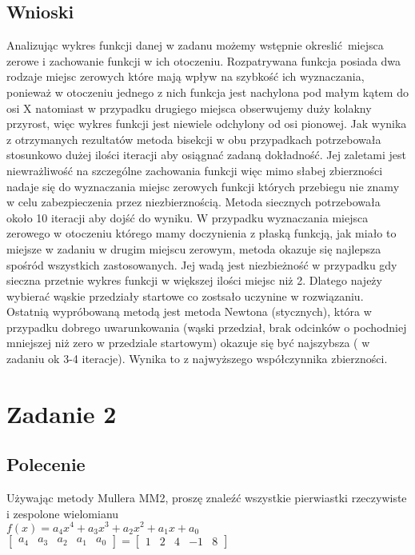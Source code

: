 \documentclass[a4paper, 11pt]{article}
\begin{document}
\subsection{Wnioski}
Analizując wykres funkcji danej w zadanu możemy wstępnie okreslić miejsca zerowe i zachowanie funkcji w ich otoczeniu. Rozpatrywana funkcja posiada dwa rodzaje miejsc zerowych które mają wpływ na szybkość ich wyznaczania, ponieważ w otoczeniu jednego z nich funkcja jest nachylona pod małym kątem do osi X natomiast w przypadku drugiego miejsca obserwujemy duży kolakny przyrost, więc wykres funkcji jest niewiele odchylony od osi pionowej. Jak wynika z otrzymanych rezultatów metoda bisekcji w obu przypadkach potrzebowała stosunkowo dużej ilości iteracji aby osiągnać zadaną dokładność. Jej zaletami jest niewrażliwość na szczególne zachowania funkcji więc mimo słabej zbierzności nadaje się do wyznaczania miejsc zerowych funkcji których przebiegu nie znamy w celu zabezpieczenia przez niezbierznością. Metoda siecznych potrzebowała około 10 iteracji aby dojść do wyniku. W przypadku wyznaczania miejsca zerowego w otoczeniu którego mamy doczynienia z płaską funkcją, jak miało to miejsze w zadaniu w drugim miejscu zerowym, metoda okazuje się najlepsza spośród wszystkich zastosowanych. Jej wadą jest niezbieżność w przypadku gdy sieczna przetnie wykres funkcji w większej ilości miejsc niż 2. Dlatego najeży wybierać wąskie przedziały startowe co zostsało uczynine w rozwiązaniu. Ostatnią wypróbowaną metodą jest metoda Newtona (stycznych), która w przypadku dobrego uwarunkowania (wąski przedział, brak odcinków o pochodniej mniejszej niż zero w przedziale startowym) okazuje się być najszybsza ( w zadaniu ok 3-4 iteracje). Wynika to z najwyższego współczynnika zbierzności. 


\section{Zadanie 2}

\subsection{Polecenie}
Używając metody Mullera MM2, proszę znaleźć wszystkie pierwiastki rzeczywiste i zespolone wielomianu \\
$f(x) = a_{4}x^4+a_{3}x^3+a_{2}x^2+a_{1}x+a_{0}$ 
$
\left[
\begin{array}{ccccc}
       a_{4} & a_{3} & a_{2} & a_{1} & a_{0}
\end{array}
\right]
=
\left[
\begin{array}{ccccc}
       1 & 2 & 4 & -1 & 8
\end{array}
\right]$
\end{document}
